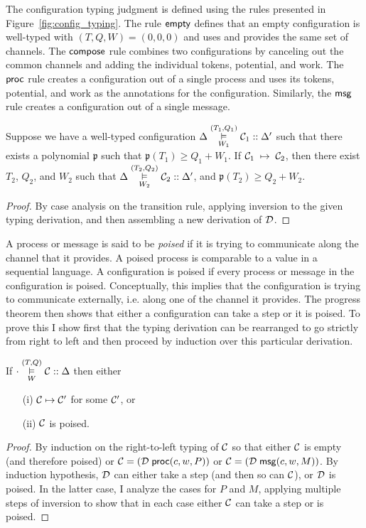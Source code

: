 The configuration typing judgment is defined using
the rules presented in Figure~\ref{fig:config_typing}.
%
The rule $\mathsf{empty}$ defines that an empty configuration
is well-typed with $(T, Q, W) = (0, 0, 0)$ and uses and
provides the same set of channels.
The $\mathsf{compose}$ rule combines two configurations by canceling out
the common channels and adding the individual tokens, potential, and work.
The $\mathsf{proc}$ rule creates a configuration out of a single process
and uses its tokens, potential, and work as the annotations for the
configuration.
Similarly, the $\mathsf{msg}$ rule creates a configuration out of a single message.

\begin{theorem}
\label{thm:preservation}
Suppose we have a well-typed configuration
$\Delta \overset{(T_1, Q_1)}{\underset{W_1}{\vDash}} \mathcal{C}_1 :: \Delta'$ such
that there exists a polynomial $\mathfrak{p}$ such that $\mathfrak{p}(T_1) \geq Q_1+W_1$.
If $\mathcal{C}_1 \; \mapsto \; \mathcal{C}_2$, then there exist $T_2$, $Q_2$, and $W_2$ such
that $\Delta \overset{(T_2, Q_2)}{\underset{W_2}{\vDash}} \mathcal{C}_2 :: \Delta'$,
and $\mathfrak{p}(T_2) \geq Q_2+W_2$.
\end{theorem}
\begin{proof}
  By case analysis on the transition rule, applying inversion to the
  given typing derivation, and then assembling a new derivation of
  $\mathcal{D}$.
\end{proof}

A process or message is said to be \emph{poised} if it is trying to
communicate along the channel that it provides.  A poised process is
comparable to a value in a sequential language. A configuration is
poised if every process or message in the configuration is poised.
Conceptually, this implies that the configuration is trying to communicate
externally, i.e. along one of the channel it provides.
The progress theorem then shows that either a configuration can take a
step or it is poised.  To prove this I show first that the typing
derivation can be rearranged to go strictly from right to left and
then proceed by induction over this particular derivation.

\begin{theorem}
\label{thm:progress}
\mbox{}
If $\cdot \overset{(T, Q)}{\underset{W}{\vDash}} \mathcal{C} :: \Delta$ then either
\begin{enumerate}
\item[(i)] $\mathcal{C} \mapsto \mathcal{C}'$ for some $\mathcal{C}'$, or
\item[(ii)] $\mathcal{C}$ is poised.
\end{enumerate}
\end{theorem}
\begin{proof}
By induction on the right-to-left typing of $\mathcal{C}$ so that either
$\mathcal{C}$ is empty (and therefore poised) or
$\mathcal{C} = (\mathcal{D}\; \mathsf{proc}(c, w, P))$ or
$\mathcal{C} = (\mathcal{D}\; \mathsf{msg}(c, w, M))$. By induction hypothesis, $\mathcal{D}$ can
either take a step (and then so can $\mathcal{C}$), or $\mathcal{D}$ is poised.  In
the latter case, I
analyze the cases for $P$ and $M$, applying multiple steps of
inversion to show that in each
case either $\mathcal{C}$ can take a step or is poised.
\end{proof}


